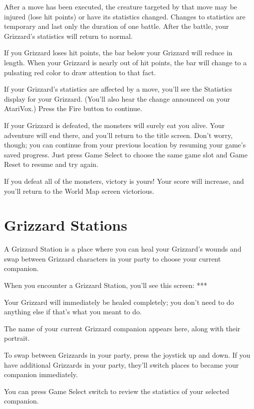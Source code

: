 \documentclass[10pt,twoside,openright]{memoir}
\begin{document}
After a move has been executed, the creature targeted by that move may be
injured (lose hit points) or have its statistics changed. Changes to
statistics are temporary and last only the duration of one battle. After the
battle, your Grizzard's statistics will return to normal.

If you Grizzard loses hit points, the bar below your Grizzard will reduce in
length. When your Grizzard is nearly out of hit points, the bar will change
to a pulsating red color to draw attention to that fact.

If your Grizzard's statistics are affected by a move, you'll see the
Statistics display for your Grizzard. (You'll also hear the change announced
on your AtariVox.) Press the Fire button to continue.

If your Grizzard is defeated, the monsters will surely eat you alive. Your
adventure will end there, and you'll return to the title screen. Don't
worry, though; you can continue from your previous location by resuming your
game's saved progress. Just press Game Select to choose the same game slot
and Game Reset to resume and try again.

If you defeat all of the monsters, victory is yours! Your score will
increase, and you'll return to the World Map screen victorious.





\section{Grizzard Stations}

A Grizzard Station is a place where you can heal your Grizzard's wounds and
swap between Grizzard characters in your party to choose your current
companion.

When you encounter a Grizzard Station, you'll see this screen: ***

Your Grizzard will immediately be healed completely; you don't need to do
anything else if that's what you meant to do.

The name of your current Grizzard companion appears here, along with their
portrait.

To swap between Grizzards in your party, press the joystick up and down. If
you have additional Grizzards in your party, they'll switch places to became
your companion immediately.

You can press Game Select switch to review the statistics of
your selected companion.
\end{document}
